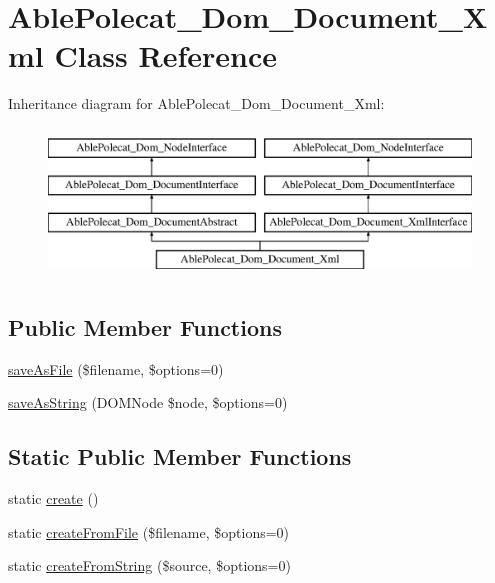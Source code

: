 \hypertarget{class_able_polecat___dom___document___xml}{}\section{Able\+Polecat\+\_\+\+Dom\+\_\+\+Document\+\_\+\+Xml Class Reference}
\label{class_able_polecat___dom___document___xml}
Inheritance diagram for Able\+Polecat\+\_\+\+Dom\+\_\+\+Document\+\_\+\+Xml\+:\begin{figure}[H]
\begin{center}
\leavevmode
\includegraphics[height=4.000000cm]{class_able_polecat___dom___document___xml}
\end{center}
\end{figure}
\subsection*{Public Member Functions}
\begin{DoxyCompactItemize}
\item 
\hyperlink{class_able_polecat___dom___document___xml_af3bb53733978ca9f7b6883b5ec65a67f}{save\+As\+File} (\$filename, \$options=0)
\item 
\hyperlink{class_able_polecat___dom___document___xml_af12ec29a0fd36c8b977895a2ea7ef95e}{save\+As\+String} (D\+O\+M\+Node \$node, \$options=0)
\end{DoxyCompactItemize}
\subsection*{Static Public Member Functions}
\begin{DoxyCompactItemize}
\item 
static \hyperlink{class_able_polecat___dom___document___xml_a239b1c70258014a86569483c2d009de6}{create} ()
\item 
static \hyperlink{class_able_polecat___dom___document___xml_afddfc3d9b5456225cd1c4bb66e296342}{create\+From\+File} (\$filename, \$options=0)
\item 
static \hyperlink{class_able_polecat___dom___document___xml_a01f8bd6cfb92479f18bce6243cde7aa0}{create\+From\+String} (\$source, \$options=0)
\end{DoxyCompactItemize}
